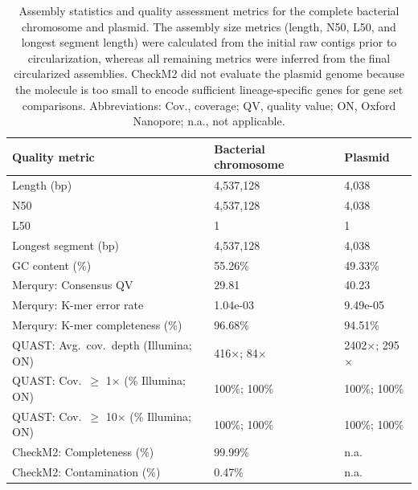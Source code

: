 \begin{table}[ht]
  \centering
  \begin{tabular}{lll}
    \hline
    \textbf{Quality metric} & \textbf{Bacterial chromosome} & \textbf{Plasmid} \\
    \hline
    Length (bp)                            & 4,537,128      & 4,038        \\
    N50                                    & 4,537,128      & 4,038        \\
    L50                                    & 1              & 1            \\
    Longest segment (bp)                   & 4,537,128      & 4,038        \\
    GC content (\%)                        & 55.26\%        & 49.33\%      \\
    Merqury: Consensus QV                  & 29.81          & 40.23        \\
    Merqury: K-mer error rate              & 1.04e-03       & 9.49e-05     \\
    Merqury: K-mer completeness (\%)       & 96.68\%        & 94.51\%      \\
    QUAST: Avg.\ cov.\ depth (Illumina; ON) & 416$\times$; 84$\times$    & 2402$\times$; 295$\times$  \\
    QUAST: Cov.\ $\geq$ 1$\times$ (\% Illumina; ON)  & 100\%; 100\% & 100\%; 100\% \\
    QUAST: Cov.\ $\geq$ 10$\times$ (\% Illumina; ON) & 100\%; 100\% & 100\%; 100\% \\
    CheckM2: Completeness (\%)             & 99.99\%        & n.a.         \\
    CheckM2: Contamination (\%)            & 0.47\%         & n.a.         \\
    \hline
  \end{tabular}
  \caption{Assembly statistics and quality assessment metrics for the complete bacterial chromosome and plasmid. The assembly size metrics (length, N50, L50, and longest segment length) were calculated from the initial raw contigs prior to circularization, whereas all remaining metrics were inferred from the final circularized assemblies. CheckM2 did not evaluate the plasmid genome because the molecule is too small to encode sufficient lineage-specific genes for gene set comparisons. Abbreviations: Cov., coverage; QV, quality value; ON, Oxford Nanopore; n.a., not applicable.}
  \label{tab:assembly_quality_metrics}
\end{table}
